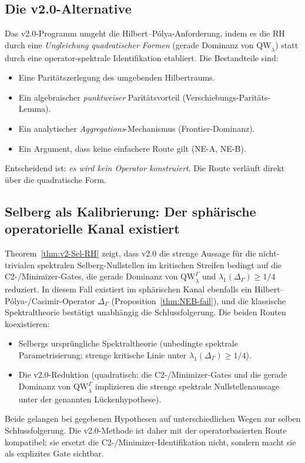 \documentclass[12pt,a4paper]{article}
\theoremstyle{definition}
\theoremstyle{remark}
\newcommand{\QW}{\mathrm{QW}}
\newcommand{\Delop}{\Delta_{\Gamma}}
\begin{document}
\subsection{Die v2.0-Alternative}

Das v2.0-Programm umgeht die Hilbert--Pólya-Anforderung, indem es
die RH durch eine \emph{Ungleichung quadratischer Formen} (gerade Dominanz
von $\QW_\lambda$) statt durch eine operator-spektrale Identifikation etabliert.
Die Bestandteile sind:
\begin{itemize}
\item Eine Paritätszerlegung des umgebenden Hilbertraums.
\item Ein algebraischer \emph{punktweiser} Paritätsvorteil (Verschiebungs-Paritäts-Lemma).
\item Ein analytischer \emph{Aggregations}-Mechanismus (Frontier-Dominanz).
\item Ein Argument, dass keine einfachere Route gilt (NE-A, NE-B).
\end{itemize}
Entscheidend ist: \emph{es wird kein Operator konstruiert}. Die Route verläuft direkt über die
quadratische Form.

\subsection{Selberg als Kalibrierung: Der sphärische operatorielle Kanal existiert}

Theorem~\ref{thm:v2-Sel-RH} zeigt, dass v2.0 die strenge Aussage für die
nicht-trivialen spektralen Selberg-Nullstellen im kritischen Streifen bedingt
auf die C2-/Minimizer-Gates, die gerade Dominanz von
$\QW^\Gamma_\lambda$ und $\lambda_1(\Delop)\ge 1/4$ reduziert.  In diesem Fall existiert im
sphärischen Kanal ebenfalls ein Hilbert--Pólya-/Casimir-Operator $\Delop$
(Proposition~\ref{thm:NEB-fail}), und die klassische Spektraltheorie
bestätigt unabhängig die Schlussfolgerung.  Die beiden Routen koexistieren:
\begin{itemize}
\item Selbergs ursprüngliche Spektraltheorie (unbedingte spektrale
  Parametrisierung; strenge kritische Linie unter $\lambda_1(\Delop)\ge 1/4$).
\item Die v2.0-Reduktion (quadratisch: die C2-/Minimizer-Gates und die gerade
  Dominanz von $\QW^\Gamma_\lambda$ implizieren die
  strenge spektrale Nullstellenaussage unter der genannten Lückenhypothese).
\end{itemize}
Beide gelangen bei gegebenen Hypothesen auf unterschiedlichen Wegen zur selben
Schlussfolgerung. Die v2.0-Methode ist daher mit der operatorbasierten Route
kompatibel; sie ersetzt die C2-/Minimizer-Identifikation nicht, sondern macht
sie als explizites Gate sichtbar.
\end{document}
